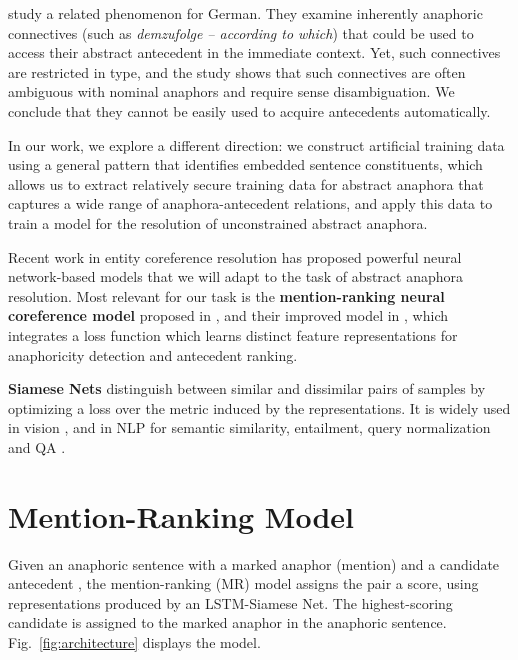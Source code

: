 \documentclass[11pt,letterpaper]{article}
\begin{document}
\citet{stede:grishina:2016:demzufolge} study a related phenomenon for German. They examine inherently anaphoric connectives 
(such as {\em demzufolge -- according to which}) that
could be used to access their abstract antecedent in the immediate context. Yet, such connectives are restricted in type, and the study shows that such connectives are often ambiguous with nominal anaphors and 
require sense disambiguation. We conclude that they cannot be easily used to acquire antecedents automatically.

In our work, we explore a different direction: we construct artificial training data using a general pattern that identifies embedded sentence constituents, which allows us to extract relatively secure training data for abstract anaphora that captures a wide range of anaphora-antecedent relations, and apply this data to train a model for the resolution of unconstrained abstract anaphora.

Recent work in entity coreference resolution has proposed powerful neural network-based models that we will adapt to the task of abstract anaphora resolution. Most relevant for our task is the \textbf{mention-ranking neural coreference model} proposed in \citet{clark2015entity}, and their improved model in \citet{clark2016deep}, which integrates a loss function \citep{wiseman2015learning} which learns distinct feature representations for anaphoricity detection and antecedent ranking.


\textbf{Siamese Nets} distinguish between similar and dissimilar pairs of samples by optimizing a loss over the metric induced by the representations. It is widely used in vision \cite{chopra2005learning}, and 
in NLP for semantic similarity, entailment, query normalization and QA \citep{mueller2016siamese, neculoiu-versteegh-rotaru:2016:RepL4NLP, Das2016TogetherWS}. 


 	
	\section{Mention-Ranking Model}
Given an anaphoric sentence  with a marked anaphor (mention) 
and a candidate antecedent , the mention-ranking (MR) model assigns  the pair  a score, using re\-pre\-sen\-ta\-tions produced by an LSTM-Siamese Net.
The highest-scoring candidate is as\-sig\-ned to the marked anaphor in the anaphoric sentence. Fig.\ \ref{fig:architecture} displays the model.
\end{document}
